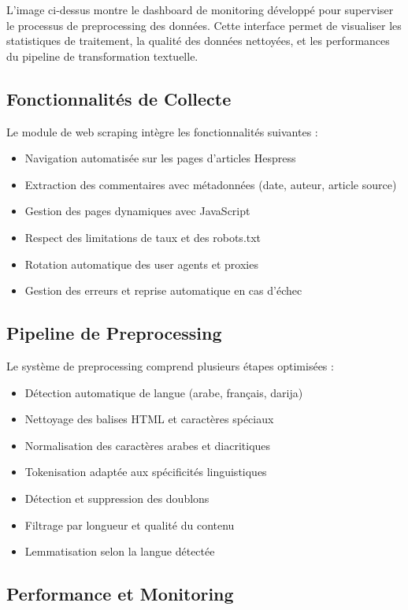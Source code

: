 L'image ci-dessus montre le dashboard de monitoring développé pour superviser le processus de preprocessing des données. Cette interface permet de visualiser les statistiques de traitement, la qualité des données nettoyées, et les performances du pipeline de transformation textuelle.

\subsection{Fonctionnalités de Collecte}

Le module de web scraping intègre les fonctionnalités suivantes :
\begin{itemize}
    \item Navigation automatisée sur les pages d'articles Hespress
    \item Extraction des commentaires avec métadonnées (date, auteur, article source)
    \item Gestion des pages dynamiques avec JavaScript
    \item Respect des limitations de taux et des robots.txt
    \item Rotation automatique des user agents et proxies
    \item Gestion des erreurs et reprise automatique en cas d'échec
\end{itemize}

\subsection{Pipeline de Preprocessing}

Le système de preprocessing comprend plusieurs étapes optimisées :
\begin{itemize}
    \item Détection automatique de langue (arabe, français, darija)
    \item Nettoyage des balises HTML et caractères spéciaux
    \item Normalisation des caractères arabes et diacritiques
    \item Tokenisation adaptée aux spécificités linguistiques
    \item Détection et suppression des doublons
    \item Filtrage par longueur et qualité du contenu
    \item Lemmatisation selon la langue détectée
\end{itemize}

\subsection{Performance et Monitoring}


